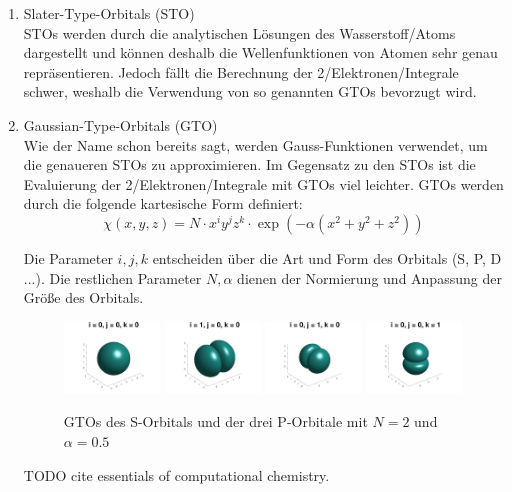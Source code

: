 \begin{enumerate}
    \item Slater-Type-Orbitals (STO)\\
    STOs werden durch die analytischen Lösungen des Wasserstoff\-/Atoms dargestellt
    und können deshalb die Wellenfunktionen von Atomen sehr genau repräsentieren.
    Jedoch fällt die Berechnung der 2\-/Elektronen\-/Integrale schwer,
    weshalb die Verwendung von so genannten GTOs bevorzugt wird.
    \item Gaussian-Type-Orbitals (GTO)\\
    Wie der Name schon bereits sagt, werden Gauss-Funktionen verwendet,
    um die genaueren STOs zu approximieren. Im Gegensatz zu den STOs ist
    die Evaluierung der 2\-/Elektronen\-/Integrale mit GTOs viel leichter.
    GTOs werden durch die folgende kartesische Form definiert:\\
    \begin{equation}
        \chi(x,y,z) = N \cdot x^i y^j z^k \cdot \exp (-\alpha (x^2+y^2+z^2))
    \end{equation}

    Die Parameter $i,j,k$ entscheiden über die Art und Form des Orbitals (S, P, D ...).
    Die restlichen Parameter $N, \alpha$ dienen der Normierung und Anpassung der Größe des Orbitals.

    \begin{figure}[h]
        \includegraphics[trim=50 0 50 0, clip, width=0.24\textwidth]{res/GTOs/ao_0_0_0.png}
        \includegraphics[trim=50 0 50 0, clip, width=0.24\textwidth]{res/GTOs/ao_1_0_0.png}
        \includegraphics[trim=50 0 50 0, clip, width=0.24\textwidth]{res/GTOs/ao_0_1_0.png}
        \includegraphics[trim=50 0 50 0, clip, width=0.24\textwidth]{res/GTOs/ao_0_0_1.png}
        \caption{GTOs des S-Orbitals und der drei P-Orbitale mit $N=2$ und $\alpha = 0.5$}
    \end{figure}

    TODO cite essentials of computational chemistry.
\end{enumerate}

